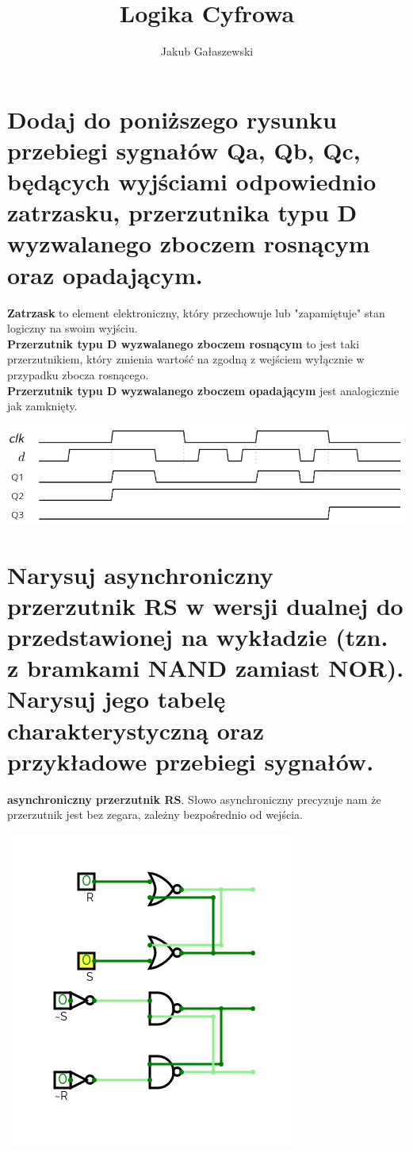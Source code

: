 \documentclass{article}
\title{Logika Cyfrowa}
\author{Jakub Gałaszewski}
\begin{document}
\maketitle
\section{Dodaj do poniższego rysunku przebiegi sygnałów Qa, Qb, Qc, będących wyjściami odpowiednio zatrzasku, przerzutnika typu D wyzwalanego zboczem rosnącym oraz opadającym.}
\textbf{Zatrzask} to element elektroniczny, który przechowuje lub "zapamiętuje" stan logiczny na swoim wyjściu.\\
\textbf{Przerzutnik typu D wyzwalanego zboczem rosnącym} to jest taki przerzutnikiem, który zmienia wartość na zgodną z wejściem wyłącznie w przypadku zbocza rosnącego.\\
\textbf{Przerzutnik typu D wyzwalanego zboczem opadającym} jest analogicznie jak zamknięty.\\
\begin{center}
\includegraphics[scale=0.3]{./L06Z01.png}
\end{center}
\section{Narysuj asynchroniczny przerzutnik RS w wersji dualnej do przedstawionej na wykładzie (tzn. z bramkami NAND zamiast NOR). Narysuj jego tabelę charakterystyczną oraz przykładowe przebiegi sygnałów.}
\textbf{asynchroniczny przerzutnik RS}. Słowo asynchroniczny precyzuje nam że przerzutnik jest bez zegara, zależny bezpośrednio od wejścia.
\begin{center}
\includegraphics[scale=0.3]{./L06Z02.png}
\end{center}
\end{document}
